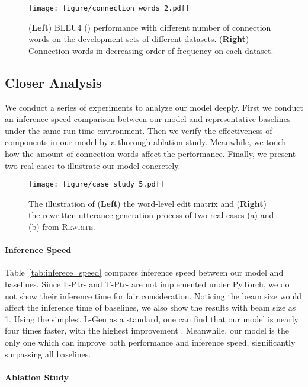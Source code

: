 \documentclass[11pt,a4paper]{article}
\begin{document}
\begin{figure}
    \centering
    \texttt{[image: figure/connection\_words\_2.pdf]}
    \caption{(\textbf{Left}) BLEU4 () performance with different number of connection words on the development sets of different datasets. (\textbf{Right}) Connection words in decreasing order of frequency on each dataset.}
    \label{fig:ablation_study}
\end{figure}


\subsection{Closer Analysis}\label{sec:closer_analysis}

We conduct a series of experiments to analyze our model deeply. First we conduct an inference speed comparison between our model and representative baselines under the same run-time environment. Then we verify the effectiveness of components in our model by a thorough ablation study. Meanwhile, we touch how the amount of connection words affect the performance. Finally, we present two real cases to illustrate our model concretely.

\begin{figure}[t]
    \centering
    \texttt{[image: figure/case\_study\_5.pdf]}
    \caption{The illustration of (\textbf{Left}) the word-level edit matrix and (\textbf{Right}) the rewritten utterance generation process of two real cases (a) and (b) from \textsc{Rewrite}. }
    \label{fig:case_study}
\end{figure}


\paragraph{Inference Speed} Table~\ref{tab:inferece_speed} compares inference speed between our model and baselines. Since L-Ptr- and T-Ptr- are not implemented under PyTorch, we do not show their inference time for fair consideration. Noticing the beam size would affect the inference time of baselines, we also show the results with beam size as 1. Using the simplest L-Gen as a standard, one can find that our model is nearly four times faster, with the highest improvement . Meanwhile, our model is the only one which can improve both performance and inference speed, significantly surpassing all baselines.


\paragraph{Ablation Study}\label{sec:expr_ablation} 
\end{document}
